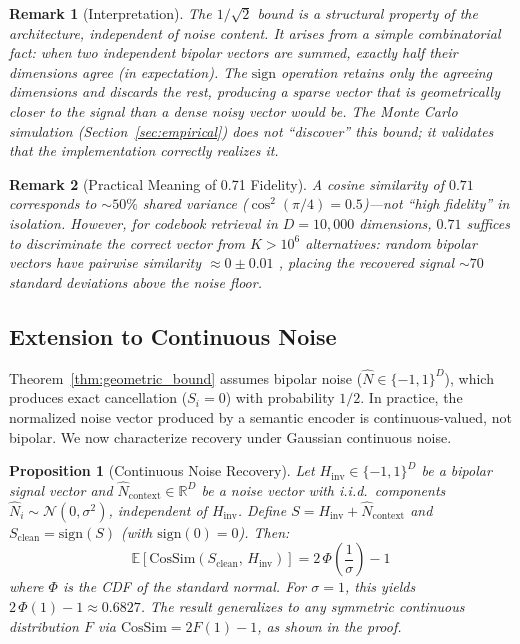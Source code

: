 \documentclass[a4paper,11pt]{article}
\newtheorem{proposition}{Proposition}
\newtheorem{remark}{Remark}
\begin{document}
\begin{remark}[Interpretation]
The $1/\sqrt{2}$ bound is a \textit{structural property of the architecture}, independent of noise content. It arises from a simple combinatorial fact: when two independent bipolar vectors are summed, exactly half their dimensions agree (in expectation). The $\text{sign}$ operation retains only the agreeing dimensions and discards the rest, producing a sparse vector that is geometrically closer to the signal than a dense noisy vector would be. The Monte Carlo simulation (Section~\ref{sec:empirical}) does not ``discover'' this bound; it \textit{validates} that the implementation correctly realizes it.
\end{remark}

\begin{remark}[Practical Meaning of 0.71 Fidelity]
\label{rem:practical_fidelity}
A cosine similarity of $0.71$ corresponds to ${\sim}50\%$ shared variance ($\cos^2(\pi/4) = 0.5$)---not ``high fidelity'' in isolation. However, for codebook retrieval in $D = 10{,}000$ dimensions, $0.71$ suffices to discriminate the correct vector from $K > 10^6$ alternatives: random bipolar vectors have pairwise similarity $\approx 0 \pm 0.01$ \cite{kanerva2009}, placing the recovered signal ${\sim}70$ standard deviations above the noise floor.
\end{remark}

\subsection{Extension to Continuous Noise}
\label{sec:continuous_noise}
Theorem~\ref{thm:geometric_bound} assumes bipolar noise ($\hat{N} \in \{-1,1\}^D$), which produces exact cancellation ($S_i = 0$) with probability $1/2$. In practice, the normalized noise vector produced by a semantic encoder is continuous-valued, not bipolar. We now characterize recovery under Gaussian continuous noise.

\begin{proposition}[Continuous Noise Recovery]
\label{prop:continuous_noise}
Let $H_{\text{inv}} \in \{-1,1\}^D$ be a bipolar signal vector and $\hat{N}_{\text{context}} \in \mathbb{R}^D$ be a noise vector with i.i.d.\ components $\hat{N}_i \sim \mathcal{N}(0, \sigma^2)$, independent of $H_{\text{inv}}$. Define $S = H_{\text{inv}} + \hat{N}_{\text{context}}$ and $S_{\text{clean}} = \text{sign}(S)$ (with $\text{sign}(0) = 0$). Then:
\begin{equation}
    \mathbb{E}\!\left[\text{CosSim}(S_{\text{clean}},\, H_{\text{inv}})\right] = 2\,\Phi\!\left(\frac{1}{\sigma}\right) - 1
    \label{eq:continuous_bound}
\end{equation}
where $\Phi$ is the CDF of the standard normal. For $\sigma = 1$, this yields $2\,\Phi(1) - 1 \approx 0.6827$. The result generalizes to any symmetric continuous distribution $F$ via $\text{CosSim} = 2F(1) - 1$, as shown in the proof.
\end{proposition}
\end{document}

